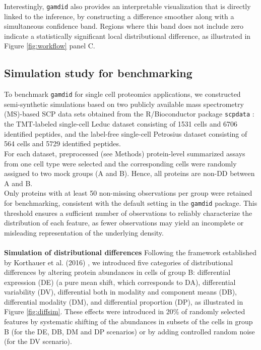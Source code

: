 Interestingly, \texttt{gamdid} also provides an interpretable visualization that is directly linked to the inference, by constructing a difference smoother along with a simultaneous confidence band. Regions where this band does not include zero indicate a statistically significant local distributional difference, as illustrated in Figure \ref{fig:workflow} panel C.
\subsection{Simulation study for benchmarking}
To benchmark \texttt{gamdid} for single cell proteomics applications, we constructed semi-synthetic simulations based on two publicly available mass spectrometry (MS)-based SCP data sets obtained from the R/Bioconductor package \texttt{scpdata} \cite{scp_paper}: the TMT-labeled single-cell Leduc dataset \cite{leduc} consisting of 1531 cells and 6706 identified peptides, and the label-free single-cell Petrosius dataset \cite{petro} consisting of 564 cells and 5729 identified peptides.\\
For each dataset, preprocessed (see Methods) protein-level summarized assays from one cell type were selected and the corresponding cells were randomly assigned to two mock groups (A and B). Hence, all proteins are non-DD between A and B.\\
Only proteins with at least 50 non-missing observations per group were retained for benchmarking, consistent with the default setting in the \texttt{gamdid} package. This threshold ensures a sufficient number of observations to reliably characterize the distribution of each feature, as fewer observations may yield an incomplete or misleading representation of the underlying density.
\\
\\
\textbf{Simulation of distributional differences}
Following the framework established by Korthauer et al. (2016) \cite{scdd}, we introduced five categories of distributional differences by altering protein abundances in cells of group B: differential expression (DE) (a pure mean shift, which corresponds to DA), differential variability (DV), differential both in modality and component means (DB), differential modality (DM), and differential proportion (DP), as illustrated in Figure \ref{fig:diffsim}. These effects were introduced in 20\% of randomly selected features by systematic shifting of the abundances in subsets of the cells in group B (for the DE, DB, DM and DP scenarios) or by adding controlled random noise (for the DV scenario).

